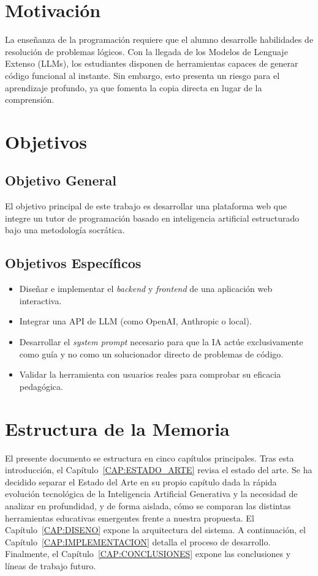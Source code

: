 \section{Motivación}
La enseñanza de la programación requiere que el alumno desarrolle habilidades de resolución de problemas lógicos. Con la llegada de los Modelos de Lenguaje Extenso (LLMs), los estudiantes disponen de herramientas capaces de generar código funcional al instante. Sin embargo, esto presenta un riesgo para el aprendizaje profundo, ya que fomenta la copia directa en lugar de la comprensión.

\section{Objetivos}
\subsection{Objetivo General}
El objetivo principal de este trabajo es desarrollar una plataforma web que integre un tutor de programación basado en inteligencia artificial estructurado bajo una metodología socrática.

\subsection{Objetivos Específicos}
\begin{itemize}
    \item Diseñar e implementar el \textit{backend} y \textit{frontend} de una aplicación web interactiva.
    \item Integrar una API de LLM (como OpenAI, Anthropic o local).
    \item Desarrollar el \textit{system prompt} necesario para que la IA actúe exclusivamente como guía y no como un solucionador directo de problemas de código.
    \item Validar la herramienta con usuarios reales para comprobar su eficacia pedagógica.
\end{itemize}

\section{Estructura de la Memoria}
El presente documento se estructura en cinco capítulos principales. Tras esta introducción, el Capítulo~\ref{CAP:ESTADO_ARTE} revisa el estado del arte. Se ha decidido separar el Estado del Arte en su propio capítulo dada la rápida evolución tecnológica de la Inteligencia Artificial Generativa y la necesidad de analizar en profundidad, y de forma aislada, cómo se comparan las distintas herramientas educativas emergentes frente a nuestra propuesta. El Capítulo~\ref{CAP:DISENO} expone la arquitectura del sistema. A continuación, el Capítulo~\ref{CAP:IMPLEMENTACION} detalla el proceso de desarrollo. Finalmente, el Capítulo~\ref{CAP:CONCLUSIONES} expone las conclusiones y líneas de trabajo futuro.
